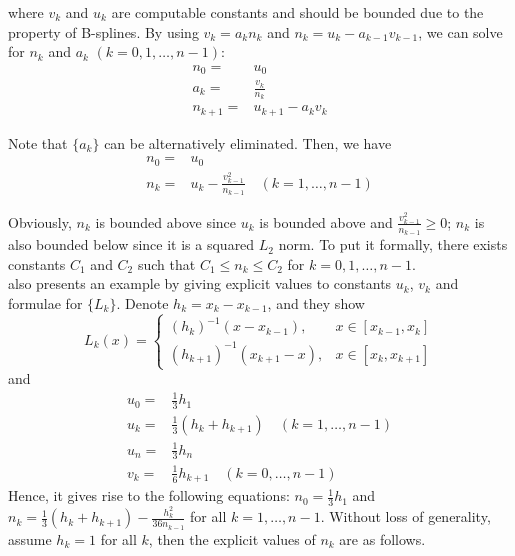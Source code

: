         where $v_k$ and $u_k$ are computable constants and should be bounded due to the property of B-splines. By using $v_k=a_kn_k$ and $n_k=u_k-a_{k-1}v_{k-1}$, we can solve for $n_k$ and $a_k$ $(k=0,1,\ldots,n-1)$:
        \begin{align*}
            n_0=&u_0\\
            a_k=&\frac{v_k}{n_k}\\
            n_{k+1}=&u_{k+1}-a_kv_k
        \end{align*}

        Note that $\{a_k\}$ can be alternatively eliminated. Then, we have
        \begin{align*}
            n_0=&u_0\\
            n_k=&u_k-\frac{v_{k-1}^2}{n_{k-1}} \quad (k=1,\ldots,n-1) 
        \end{align*}

        Obviously, $n_k$ is bounded above since $u_k$ is bounded above and $\frac{v_{k-1}^2}{n_{k-1}}\ge0$; $n_k$ is also bounded below since it is a squared $L_2$ norm. To put it formally, there exists constants $C_1$ and $C_2$ such that $C_1 \le n_k \le C_2$ for $k=0,1,\ldots,n-1$.\\

        \cite{Mason_1993} also presents an example by giving explicit values to constants $u_k$, $v_k$ and formulae for $\{L_k\}$. Denote $h_k=x_k-x_{k-1}$, and they show
        \[
            L_k(x)=
            \left\{
            \begin{array}{cc}
                (h_k)^{-1}(x-x_{k-1}), &x \in [x_{k-1},x_k]\\
                (h_{k+1})^{-1}(x_{k+1}-x), &x \in [x_k,x_{k+1}]
                \end{array}
            \right.
        \]
        and
            \begin{align*}
                u_0=&\frac{1}{3}h_1\\
                u_k=&\frac{1}{3}(h_k+h_{k+1}) \quad (k=1,\ldots,n-1)\\
                u_n=&\frac{1}{3}h_n\\
                v_k=&\frac{1}{6}h_{k+1} \quad (k=0,\ldots,n-1)
            \end{align*}
        Hence, it gives rise to the following equations: $n_0=\frac{1}{3}h_1$ and $n_k=\frac{1}{3}(h_k+h_{k+1})-\frac{h_{k}^2}{36n_{k-1}}$ for all $k=1,\ldots,n-1$. Without loss of generality, assume $h_k=1$ for all $k$, then the explicit values of $n_k$ are as follows.
                

